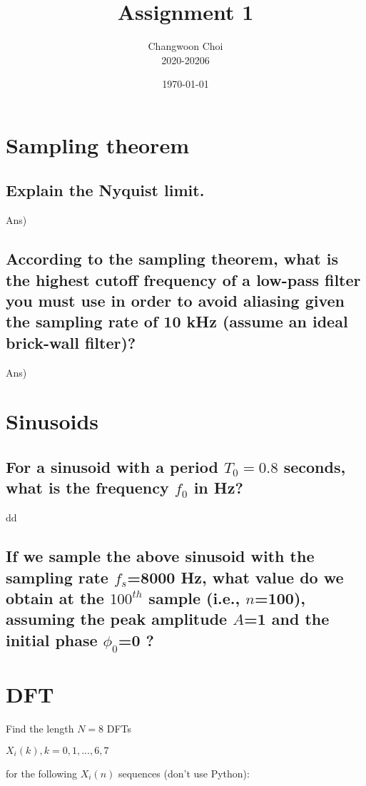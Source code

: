 \documentclass[12pt]{article}%
\begin{document}
\title{Assignment 1}
\author{Changwoon Choi \\ 2020-20206}
\date{\today}
\maketitle

\section{Sampling theorem}
\subsection{Explain the Nyquist limit.}
Ans) \\


\subsection{According to the sampling theorem, what is the highest cutoff frequency of a low-pass filter you must use in order to avoid aliasing given the sampling rate of 10 kHz (assume an ideal brick-wall filter)?}
Ans) \\

\section{Sinusoids}

\subsection{For a sinusoid with a period $T_0 = 0.8$  seconds, what is the frequency $f_0$ in Hz?}
dd
\subsection{If we sample the above sinusoid with the sampling rate $f_s$=8000 Hz, what value do we obtain at the $100^{th}$  sample (i.e., $n$=100), assuming the peak amplitude $A$=1  and the initial phase $\phi_0$=0  ?}

\section{DFT}
Find the length $N=8$ DFTs \\ 
\begin{center}
    $X_i (k), k = 0, 1, ..., 6, 7$
\end{center}
for the following $X_i (n)$ sequences (don't use Python):
\end{document}
